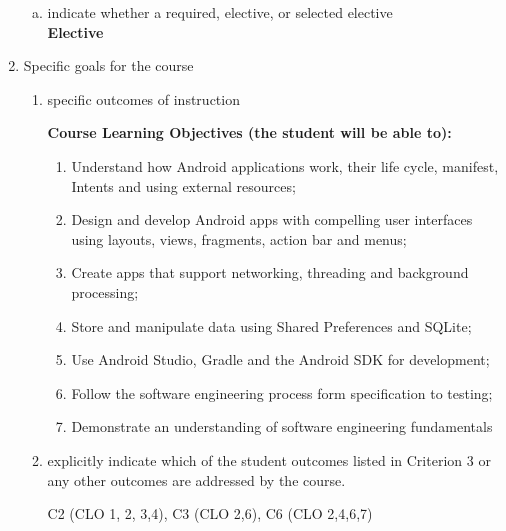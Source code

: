 \begin{enumerate}[1.]
\begin{enumerate}[a.]
\item indicate whether a required, elective, or selected elective\\ %
  {\bfseries
    Elective
  }

\end{enumerate}

\item Specific goals for the course
\begin{enumerate}
\item specific outcomes of instruction\\ %
  {\bfseries
    Course Learning Objectives (the student will be able to):
\begin{enumerate}
\item Understand how Android applications work, their life cycle, manifest, Intents and using external resources;
\item Design and develop Android apps with compelling user interfaces using layouts, views, fragments, action bar and menus;
\item Create apps that support networking, threading and background processing;
\item Store and manipulate data using Shared Preferences and SQLite;
\item Use Android Studio, Gradle and the Android SDK for development;
\item Follow the software engineering process form specification to testing;
\item Demonstrate an understanding of software engineering fundamentals
\end{enumerate}
  }

\item explicitly indicate which of the student outcomes listed in Criterion 3 or any other outcomes are addressed by the course.\\
  {\bfseries

    C2 (CLO 1, 2, 3,4),
    C3 (CLO 2,6),
	C6 (CLO 2,4,6,7)
  }
\end{enumerate}


\end{enumerate}
